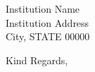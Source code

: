 \documentclass{letter} %
\begin{document}
\begin{letter}{
    Institution Name \\
    Institution Address \\
    City, STATE 00000
}
\closing{Kind Regards,\\
 \\
}




\end{letter}
\end{document}
